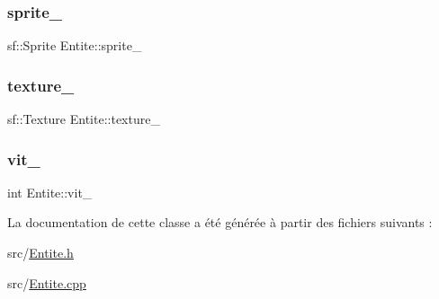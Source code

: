 \mbox{\label{class_entite_ab7c03b6fe5c4f1d08cd3e4304e0ef7c0}} 
\subsubsection{\texorpdfstring{sprite\+\_\+}{sprite\_}}
{\footnotesize\ttfamily sf\+::\+Sprite Entite\+::sprite\+\_\+\hspace{0.3cm}{\ttfamily [protected]}}

\mbox{\label{class_entite_a8147b9459318a9b1de1b72dce115680a}} 
\subsubsection{\texorpdfstring{texture\+\_\+}{texture\_}}
{\footnotesize\ttfamily sf\+::\+Texture Entite\+::texture\+\_\+\hspace{0.3cm}{\ttfamily [protected]}}

\mbox{\label{class_entite_a62c3145096f707457d60306ea6729ed6}} 
\subsubsection{\texorpdfstring{vit\+\_\+}{vit\_}}
{\footnotesize\ttfamily int Entite\+::vit\+\_\+\hspace{0.3cm}{\ttfamily [protected]}}



La documentation de cette classe a été générée à partir des fichiers suivants \+:\begin{DoxyCompactItemize}
\item 
src/\hyperlink{_entite_8h}{Entite.\+h}\item 
src/\hyperlink{_entite_8cpp}{Entite.\+cpp}\end{DoxyCompactItemize}
